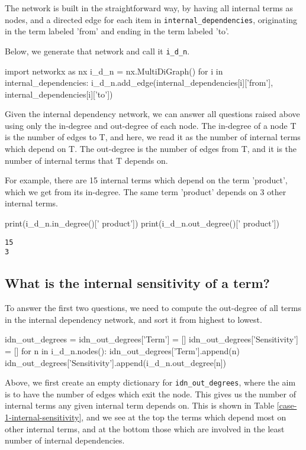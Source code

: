 The network is built in the straightforward way, by having all internal terms as nodes, and a directed edge for each item in \verb|internal_dependencies|, originating in the term labeled 'from' and ending in the term labeled 'to'.

Below, we generate that network and call it \verb|i_d_n|.

\begin{pycode}
import networkx as nx
i_d_n = nx.MultiDiGraph()
for i in internal_dependencies:
    i_d_n.add_edge(internal_dependencies[i]['from'], internal_dependencies[i]['to'])
\end{pycode}

Given the internal dependency network, we can answer all questions raised above using only the in-degree and out-degree of each node. The in-degree of a node T is the number of edges to T, and here, we read it as the number of internal terms which depend on T. The out-degree is the number of edges from T, and it is the number of internal terms that T depends on.

For example, there are 15 internal terms which depend on the term 'product', which we get from its in-degree. The same term 'product' depends on 3 other internal terms.

\begin{pycode}
print(i_d_n.in_degree()[' product'])
print(i_d_n.out_degree()[' product'])
\end{pycode}

\begin{lstlisting}[breaklines]
15
3
\end{lstlisting}


\subsection{What is the internal sensitivity of a term?}
\label{c7:s3:ss2}
To answer the first two questions, we need to compute the out-degree of all terms in the internal dependency network, and sort it from highest to lowest. 

\begin{pycode}
idn_out_degrees = {}
idn_out_degrees['Term'] = []
idn_out_degrees['Sensitivity'] = []
for n in i_d_n.nodes():
    idn_out_degrees['Term'].append(n)
    idn_out_degrees['Sensitivity'].append(i_d_n.out_degree[n]) 
\end{pycode}

Above, we first create an empty dictionary for \verb|idn_out_degrees|, where the aim is to have the number of edges which exit the node. This gives us the number of internal terms any given internal term depends on. This is shown in Table \ref{case-1-internal-sensitivity}, and we see at the top the terms which depend most on other internal terms, and at the bottom those which are involved in the least number of internal dependencies. 

